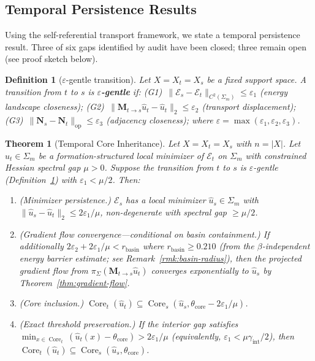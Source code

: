 \documentclass[lettersize,journal]{IEEEtran}
\newtheorem{theorem}{Theorem}
\newtheorem{definition}{Definition}
\DeclareMathOperator{\Core}{Core}
\begin{document}
\subsection{Temporal Persistence Results}

Using the self-referential transport framework, we state a temporal persistence result. Three of six gaps identified by audit have been closed; three remain open (see proof sketch below).

\begin{definition}[$\varepsilon$-gentle transition]
\label{def:gentle}
Let $X = X_t = X_s$ be a fixed support space. A transition from $t$ to $s$ is \textbf{$\varepsilon$-gentle} if:
\emph{(G1)}~$\|\mathcal{E}_s - \mathcal{E}_t\|_{C^2(\Sigma_m)} \leq \varepsilon_1$ (energy landscape closeness);
\emph{(G2)}~$\|\mathbf{M}_{t \to s}\hat{u}_t - \hat{u}_t\|_2 \leq \varepsilon_2$ (transport displacement);
\emph{(G3)}~$\|\mathbf{N}_s - \mathbf{N}_t\|_{\mathrm{op}} \leq \varepsilon_3$ (adjacency closeness);
where $\varepsilon = \max(\varepsilon_1, \varepsilon_2, \varepsilon_3)$.
\end{definition}

\begin{theorem}[Temporal Core Inheritance]
\label{thm:temporal-persistence}
Let $X = X_t = X_s$ with $n = |X|$. Let $\hat{u}_t \in \Sigma_m$ be a formation-structured local minimizer of $\mathcal{E}_t$ on $\Sigma_m$ with constrained Hessian spectral gap $\mu > 0$. Suppose the transition from $t$ to $s$ is $\varepsilon$-gentle (Definition~\ref{def:gentle}) with $\varepsilon_1 < \mu/2$. Then:
\begin{enumerate}
\item[(a)] \emph{(Minimizer persistence.)} $\mathcal{E}_s$ has a local minimizer $\hat{u}_s \in \Sigma_m$ with $\|\hat{u}_s - \hat{u}_t\|_2 \leq 2\varepsilon_1/\mu$, non-degenerate with spectral gap $\geq \mu/2$.
\item[(b)] \emph{(Gradient flow convergence---conditional on basin containment.)} If additionally $2\varepsilon_2 + 2\varepsilon_1/\mu < r_{\mathrm{basin}}$ where $r_{\mathrm{basin}} \geq 0.210$ (from the $\beta$-independent energy barrier estimate; see Remark~\ref{rmk:basin-radius}), then the projected gradient flow from $\pi_\Sigma(\mathbf{M}_{t\to s}\hat{u}_t)$ converges exponentially to $\hat{u}_s$ by Theorem~\ref{thm:gradient-flow}.
\item[(c)] \emph{(Core inclusion.)} $\Core_t(\hat{u}_t) \subseteq \Core_s(\hat{u}_s, \theta_{\mathrm{core}} - 2\varepsilon_1/\mu)$.
\item[(d)] \emph{(Exact threshold preservation.)} If the interior gap satisfies $\min_{x \in \Core_t}(\hat{u}_t(x) - \theta_{\mathrm{core}}) > 2\varepsilon_1/\mu$ (equivalently, $\varepsilon_1 < \mu\gamma_{\mathrm{int}}/2$), then $\Core_t(\hat{u}_t) \subseteq \Core_s(\hat{u}_s, \theta_{\mathrm{core}})$.
\end{enumerate}
\end{theorem}
\end{document}
